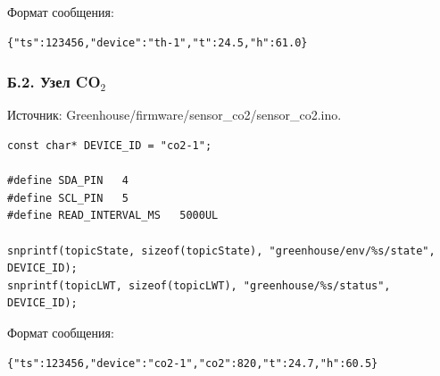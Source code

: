 \documentclass[a4paper,14pt]{extarticle}
\renewcommand{\texttt}[1]{\textnormal{#1}}
\begin{document}
Формат сообщения:

\par\vspace{8pt}\noindent\begin{minipage}{\linewidth}
\setlength{\topsep}{3pt}\setlength{\partopsep}{0pt}
\begin{verbatim}
{"ts":123456,"device":"th-1","t":24.5,"h":61.0}
\end{verbatim}
\end{minipage}\par\vspace{8pt}

\hypertarget{ux431.2.-ux443ux437ux435ux43b-co_2}{%
\subsubsection{\texorpdfstring{Б.2. Узел
CO\(_2\)}{Б.2. Узел CO\_2}}\label{ux431.2.-ux443ux437ux435ux43b-co_2}}

Источник: \texttt{Greenhouse/firmware/sensor\_co2/sensor\_co2.ino}.

\par\vspace{8pt}\noindent\begin{minipage}{\linewidth}
\setlength{\topsep}{3pt}\setlength{\partopsep}{0pt}
\begin{verbatim}
const char* DEVICE_ID = "co2-1";

#define SDA_PIN   4
#define SCL_PIN   5
#define READ_INTERVAL_MS   5000UL

snprintf(topicState, sizeof(topicState), "greenhouse/env/%s/state", DEVICE_ID);
snprintf(topicLWT, sizeof(topicLWT), "greenhouse/%s/status", DEVICE_ID);
\end{verbatim}
\end{minipage}\par\vspace{8pt}

Формат сообщения:

\par\vspace{8pt}\noindent\begin{minipage}{\linewidth}
\setlength{\topsep}{3pt}\setlength{\partopsep}{0pt}
\begin{verbatim}
{"ts":123456,"device":"co2-1","co2":820,"t":24.7,"h":60.5}
\end{verbatim}
\end{minipage}\par\vspace{8pt}
\end{document}
